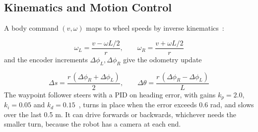 \documentclass[conference]{IEEEtran}
\begin{document}
\subsection{Kinematics and Motion Control}
A body command $(v, \omega)$ maps to wheel speeds by inverse kinematics~\cite{r4}:

\begin{equation}
\omega_L = \frac{v - \omega L/2}{r}, \qquad \omega_R = \frac{v + \omega L/2}{r}
\label{eq:ik}
\end{equation}
and the encoder increments $\Delta\phi_L, \Delta\phi_R$ give the odometry update

\begin{equation}
\Delta s = \frac{r\,(\Delta\phi_R + \Delta\phi_L)}{2}, \qquad \Delta\theta = \frac{r\,(\Delta\phi_R - \Delta\phi_L)}{L}
\label{eq:odom}
\end{equation}
The waypoint follower steers with a PID on heading error, with gains $k_p = 2.0$, $k_i = 0.05$ and $k_d = 0.15$~\cite{r10}, turns in place when the error exceeds 0.6 rad, and slows over the last 0.5 m. It can drive forwards or backwards, whichever needs the smaller turn, because the robot has a camera at each end.
\end{document}
